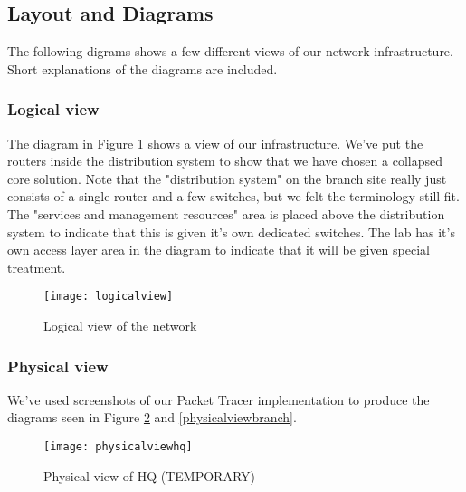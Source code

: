 \subsection{Layout and Diagrams}


The following digrams shows a few different views of our network infrastructure. Short explanations of the diagrams are included.

\subsubsection{Logical view}


The diagram in Figure \ref{logicalview} shows a view of our infrastructure. We've put the routers inside the distribution system to show that we have chosen a collapsed core solution. Note that the "distribution system" on the branch site really just consists of a single router and a few switches, but we felt the terminology still fit. The "services and management resources" area is placed above the distribution system to indicate that this is given it's own dedicated switches. The lab has it's own access layer area in the diagram to indicate that it will be given special treatment.

\begin{figure}[H]
\caption{Logical view of the network}
\centering
\texttt{[image: logicalview]}
\label{logicalview}
\end{figure}

\subsubsection{Physical view}

We've used screenshots of our Packet Tracer implementation to produce the diagrams seen in Figure \ref{physicalviewhq} and \ref{physicalviewbranch}.



\begin{figure}[H]
\caption{Physical view of HQ (TEMPORARY)}
\centering
\texttt{[image: physicalviewhq]}
\label{physicalviewhq}
\end{figure}


